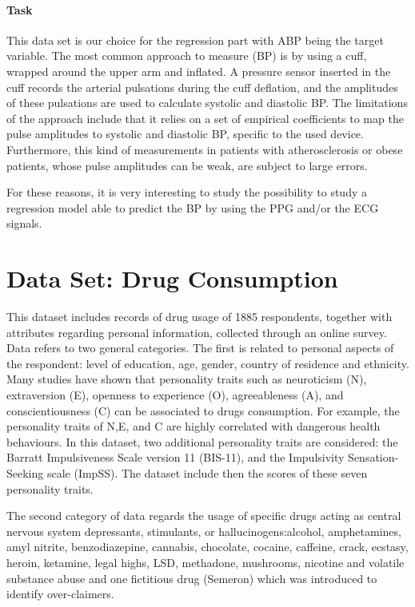 \documentclass{article}
\begin{document}
\paragraph{Task}
\noindent This data set is our choice for the regression part with ABP being the target variable.
The most common approach to measure (BP) is by using a cuff, wrapped around the upper arm and inflated. A pressure sensor inserted in the cuff records the arterial pulsations during the cuff deflation, and the amplitudes of these pulsations are used to calculate systolic and diastolic BP. The limitations of the approach include that it relies on a set of empirical coefficients to map the pulse amplitudes to systolic and diastolic BP, specific to the used device. Furthermore, this kind of measurements in patients with atherosclerosis or obese patients, whose pulse amplitudes can be weak, are subject to large errors.

For these reasons, it is very interesting to study the possibility to study a regression model able to predict the BP by using the PPG and/or the ECG signals.





\section{Data Set: Drug Consumption}
This dataset \cite{fehrman2017factor} includes records of drug usage of 1885 respondents, together with attributes regarding personal information, collected through an online survey. Data refers to two general categories. 
The first is related to personal aspects of the respondent: level of education, age, gender, country of residence and ethnicity. Many studies have shown that personality traits such as neuroticism (N), extraversion (E), openness to experience (O), agreeableness (A), and conscientiousness (C) can be associated to drugs consumption. For example, the personality traits of N,E, and C are highly correlated with dangerous health behaviours. In this dataset, two additional personality traits are considered: the Barratt Impulsiveness Scale version 11 (BIS-11), and the Impulsivity Sensation-Seeking scale (ImpSS). The dataset include then the scores of these seven personality traits.

The second category of data regards the usage of specific drugs acting as central nervous system depressants, stimulants, or hallucinogens:alcohol, amphetamines, amyl nitrite, benzodiazepine, cannabis, chocolate, cocaine, caffeine, crack, ecstasy, heroin, ketamine, legal highs, LSD, methadone, mushrooms, nicotine and volatile substance abuse and one fictitious drug (Semeron) which was introduced to identify over-claimers. 
\end{document}
